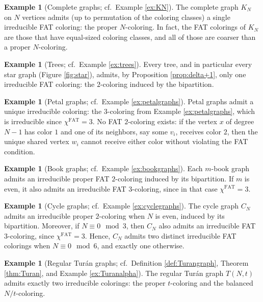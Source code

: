 \documentclass{article}
\theoremstyle{plain}
\theoremstyle{definition}
\newtheorem{example}[theorem]{Example}
\theoremstyle{remark}
\begin{document}
\begin{example}[Complete graphs; cf.\ Example \ref{ex:KN}]
    The complete graph $K_N$ on $N$ vertices admits (up to permutation of the coloring classes) a single irreducible FAT coloring: the proper $N$-coloring. In fact, the FAT colorings of $K_N$ are those that have equal-sized coloring classes, and all of those are coarser than a proper $N$-coloring.
\end{example}
\begin{example}[Trees; cf.\ Example \ref{ex:trees}]
    Every tree, and in particular every star graph (Figure \ref{fig:star}), admits, by Proposition \ref{prop:delta+1}, only one irreducible FAT coloring: the $2$-coloring induced by the bipartition.
\end{example}
\begin{example}[Petal graphs; cf.\ Example \ref{ex:petalgraphs}]
    Petal graphs admit a unique irreducible coloring: the $3$-coloring from Example \ref{ex:petalgraphs}, which is irreducible since $\chi^{\mathrm{FAT}}=3$.
    No FAT $2$-coloring exists: if the vertex $x$ of degree $N-1$ has color $1$ and one of its neighbors, say some $v_i$, receives color $2$, then the unique shared vertex $w_i$ cannot receive either color without violating the FAT condition.
\end{example}
\begin{example}[Book graphs; cf.\ Example \ref{ex:bookgraphs}]
    Each $m$-book graph admits an irreducible proper FAT $2$-coloring induced by its bipartition.
    If $m$ is even, it also admits an irreducible FAT $3$-coloring, since in that case $\chi^{\mathrm{FAT}}=3$.
\end{example}
\begin{example}[Cycle graphs; cf.\ Example \ref{ex:cyclegraphs}]
    The cycle graph $C_N$ admits an irreducible proper $2$-coloring when $N$ is even, induced by its bipartition.
    Moreover, if $N\equiv 0\mod 3$, then $C_N$ also admits an irreducible FAT $3$-coloring, since $\chi^{\mathrm{FAT}}=3$.
    Hence, $C_N$ admits two distinct irreducible FAT colorings when $N\equiv0\mod6$, and exactly one otherwise.
\end{example}
\begin{example}[Regular Turán graphs; cf.\ Definition \ref{def:Turangraph}, Theorem \ref{thm:Turan}, and Example \ref{ex:Turanalpha}]
    The regular Turán graph $T(N,t)$ admits exactly two irreducible colorings: the proper $t$-coloring and the balanced $N/t$-coloring.
\end{example}
\end{document}
